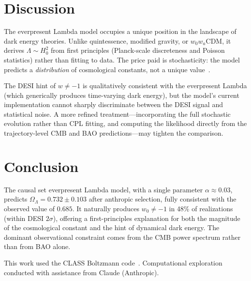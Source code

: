 \documentclass[aps,prd,twocolumn,superscriptaddress,nofootinbib]{revtex4-2}
\begin{document}
\section{Discussion}

The everpresent Lambda model occupies a unique position in the landscape of dark energy theories. Unlike quintessence, modified gravity, or $w_0 w_a$CDM, it derives $\Lambda \sim H_0^2$ from first principles (Planck-scale discreteness and Poisson statistics) rather than fitting to data. The price paid is stochasticity: the model predicts a \emph{distribution} of cosmological constants, not a unique value~\cite{zwane2018}.

The DESI hint of $w \neq -1$ is qualitatively consistent with the everpresent Lambda (which generically produces time-varying dark energy), but the model's current implementation cannot sharply discriminate between the DESI signal and statistical noise. A more refined treatment---incorporating the full stochastic evolution rather than CPL fitting, and computing the likelihood directly from the trajectory-level CMB and BAO predictions---may tighten the comparison.

\section{Conclusion}

The causal set everpresent Lambda model, with a single parameter $\alpha \approx 0.03$, predicts $\Omega_\Lambda = 0.732 \pm 0.103$ after anthropic selection, fully consistent with the observed value of $0.685$. It naturally produces $w_0 \neq -1$ in 48\% of realizations (within DESI $2\sigma$), offering a first-principles explanation for both the magnitude of the cosmological constant and the hint of dynamical dark energy. The dominant observational constraint comes from the CMB power spectrum rather than from BAO alone.

\begin{acknowledgments}
This work used the CLASS Boltzmann code~\cite{class}. Computational exploration conducted with assistance from Claude (Anthropic).
\end{acknowledgments}
\end{document}
